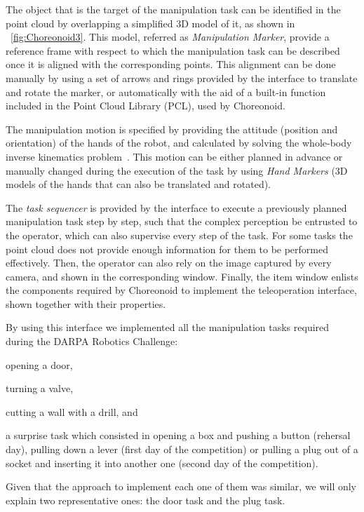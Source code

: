 	The object that is the target of the manipulation task can be identified in the point cloud
	by overlapping a simplified 3D model of it, as shown in \figurename~\ref{fig:Choreonoid3}.
	This model, referred as \emph{Manipulation Marker}, provide a reference frame with respect
	to which the manipulation task can be described once it is aligned with the corresponding
	points.
	This alignment can be done manually by using a set of arrows and rings provided by the interface
	to translate and rotate the marker, or automatically with the aid of a built-in function included
	in the Point Cloud Library (PCL), used by Choreonoid.
	
	The manipulation motion is specified by providing the attitude (position and orientation)
	of the hands of the robot, and calculated by solving the whole-body inverse kinematics
	problem~\cite{Kanoun}.
	This motion can be either planned in advance or manually changed during the execution of the task
	by using \emph{Hand Markers} (3D models of the hands that can also be translated and rotated).
	
	The \emph{task sequencer} is provided by the interface to execute a previously planned manipulation
	task step by step, such that the complex perception be entrusted to the operator, which	can also
	supervise every step of the task.
	For some tasks the point cloud does not provide enough information for them to be performed effectively.
	Then, the operator can also rely on the image captured by every camera,
	and shown in the corresponding window.
	Finally, the item window enlists the components required by Choreonoid to implement the teleoperation
	interface, shown together with their properties.
	
	By using this interface we implemented all the manipulation tasks required during the
	DARPA Robotics Challenge:
	\begin{inparaenum}[(1)]
		\item opening a door,
		\item turning a valve,
		\item cutting a wall with a drill, and
		\item a surprise task which consisted in opening a box and pushing a button (rehersal day),
					pulling down a lever (first day of the competition) or
					pulling a plug out of a socket and inserting it into another one (second day of the competition).
	\end{inparaenum}
	Given that the approach to implement each one of them was similar,
	we will only explain two representative ones:
	the door task and the plug task.